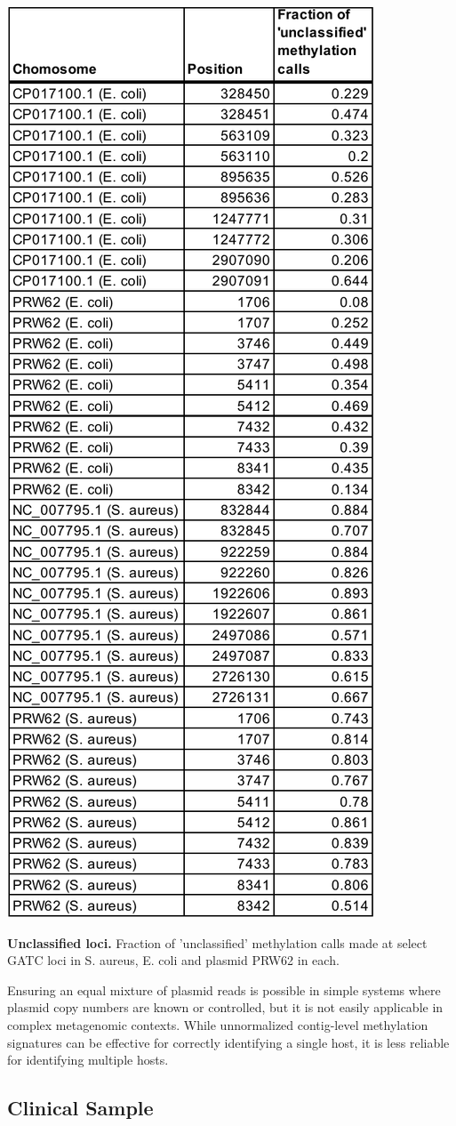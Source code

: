 \begin{table}[!hb]
\centering
\includegraphics[width = .5\linewidth,keepaspectratio]{figure/modprobs.pdf}
\caption[Unclassified loci]{{\bf Unclassified loci.} Fraction of 'unclassified' methylation calls made at select GATC loci in S. aureus, E. coli and plasmid PRW62 in each. }
\label{tab:modprobs}
\end{table}


Ensuring an equal mixture of plasmid reads is possible in simple systems where plasmid copy numbers are known or controlled, but it is not easily applicable in complex metagenomic contexts. While unnormalized contig-level methylation signatures can be effective for correctly identifying a single host, it is less reliable for identifying multiple hosts.


\subsection{Clinical Sample}
\label{sec:mdr}

